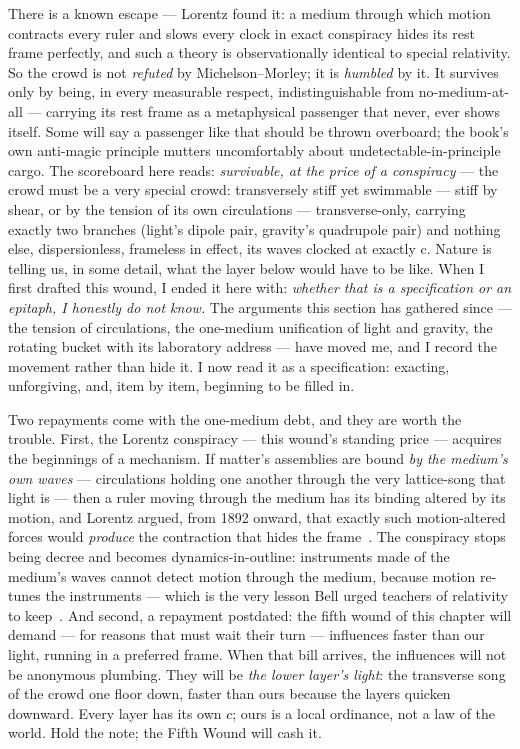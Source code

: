 \documentclass[fontsize=11pt,paper=a4,pagesize=auto,parskip=half-]{scrbook}
\begin{document}
There is a known escape --- Lorentz found it: a medium through which motion contracts every ruler and slows every clock in exact conspiracy hides its rest frame perfectly, and such a theory is observationally identical to special relativity. So the crowd is not \emph{refuted} by Michelson--Morley; it is \emph{humbled} by it. It survives only by being, in every measurable respect, indistinguishable from no-medium-at-all --- carrying its rest frame as a metaphysical passenger that never, ever shows itself. Some will say a passenger like that should be thrown overboard; the book's own anti-magic principle mutters uncomfortably about undetectable-in-principle cargo. The scoreboard here reads: \emph{survivable, at the price of a conspiracy} --- the crowd must be a very special crowd: transversely stiff yet swimmable --- stiff by shear, or by the tension of its own circulations --- transverse-only, carrying exactly two branches (light's dipole pair, gravity's quadrupole pair) and nothing else, dispersionless, frameless in effect, its waves clocked at exactly c. Nature is telling us, in some detail, what the layer below would have to be like. When I first drafted this wound, I ended it here with: \emph{whether that is a specification or an epitaph, I honestly do not know.} The arguments this section has gathered since --- the tension of circulations, the one-medium unification of light and gravity, the rotating bucket with its laboratory address --- have moved me, and I record the movement rather than hide it. I now read it as a specification: exacting, unforgiving, and, item by item, beginning to be filled in.

Two repayments come with the one-medium debt, and they are worth the trouble. First, the Lorentz conspiracy --- this wound's standing price --- acquires the beginnings of a mechanism. If matter's assemblies are bound \emph{by the medium's own waves} --- circulations holding one another through the very lattice-song that light is --- then a ruler moving through the medium has its binding altered by its motion, and Lorentz argued, from 1892 onward, that exactly such motion-altered forces would \emph{produce} the contraction that hides the frame~\cite{lorentz1904}. The conspiracy stops being decree and becomes dynamics-in-outline: instruments made of the medium's waves cannot detect motion through the medium, because motion re-tunes the instruments --- which is the very lesson Bell urged teachers of relativity to keep~\cite{bell1987}. And second, a repayment postdated: the fifth wound of this chapter will demand --- for reasons that must wait their turn --- influences faster than our light, running in a preferred frame. When that bill arrives, the influences will not be anonymous plumbing. They will be \emph{the lower layer's light}: the transverse song of the crowd one floor down, faster than ours because the layers quicken downward. Every layer has its own $c$; ours is a local ordinance, not a law of the world. Hold the note; the Fifth Wound will cash it.
\end{document}
